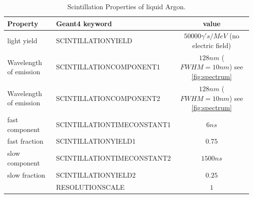 \documentclass{article}
\begin{document}
\cite{ref:ettore}


  \begin{table}[h!]
  \begin{center}
    \label{tab:table1}
    \begin{tabular}{|l|l|c|} %
      \hline
      \textbf{Property}& \textbf{Geant4 keyword} &       \textbf{value}\\
      \hline
      light yield&SCINTILLATIONYIELD & $50000 \gamma 's/MeV$ (no electric field)\\
      Wavelength of emission&SCINTILLATIONCOMPONENT1 &  $128nm$ ($FWHM=10nm$) see \ref{fig:spectrum}\\
      Wavelength of emission&SCINTILLATIONCOMPONENT2 &  $128nm$ ($FWHM=10nm$)  see \ref{fig:spectrum}\\
      fast component&SCINTILLATIONTIMECONSTANT1& $6 ns$\\  
      fast fraction&SCINTILLATIONYIELD1& $0.75$ \\
      slow component&SCINTILLATIONTIMECONSTANT2& $1500 ns$ \\
      slow fraction&SCINTILLATIONYIELD2& $0.25$\\
                   &RESOLUTIONSCALE& $1$\\
      \hline
    \end{tabular}
  \end{center}
  \caption{Scintillation Properties of liquid Argon.}
  \end{table}
\end{document}
